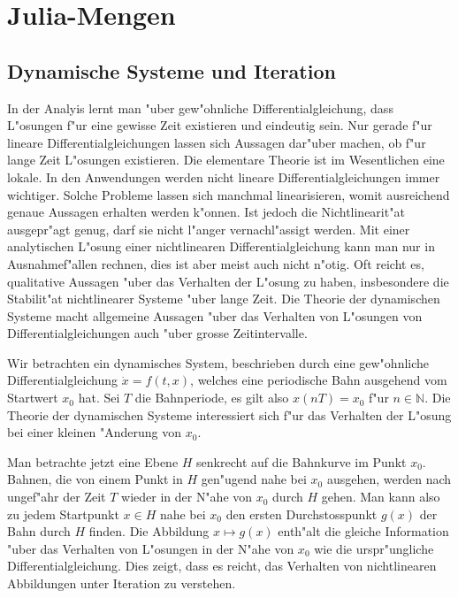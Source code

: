 \chapter{Julia-Mengen}
\begin{refsection}

\section{Dynamische Systeme und Iteration}
In der Analyis lernt man "uber 
gew"ohnliche Differentialgleichung, dass L"osungen f"ur eine gewisse
Zeit existieren und eindeutig sein.
Nur gerade f"ur lineare Differentialgleichungen lassen sich Aussagen 
dar"uber machen, ob f"ur lange Zeit L"osungen existieren.
Die elementare Theorie ist im Wesentlichen eine lokale.
In den Anwendungen werden nicht lineare Differentialgleichungen immer
wichtiger.
Solche Probleme lassen sich manchmal linearisieren, womit ausreichend
genaue Aussagen erhalten werden k"onnen.
Ist jedoch die Nichtlinearit"at ausgepr"agt genug, darf sie nicht l"anger
vernachl"assigt werden.
Mit einer analytischen L"osung einer nichtlinearen Differentialgleichung
kann man nur in Ausnahmef"allen rechnen, dies ist aber meist auch nicht
n"otig. Oft reicht es, qualitative Aussagen "uber das Verhalten der
L"osung zu haben,
insbesondere die Stabilit"at nichtlinearer Systeme "uber lange Zeit.
Die Theorie der dynamischen Systeme macht allgemeine Aussagen "uber das
Verhalten von L"osungen von Differentialgleichungen auch "uber grosse
Zeitintervalle.

Wir betrachten ein dynamisches System, beschrieben durch eine
gew"ohnliche Differentialgleichung $\dot x= f(t,x)$, welches eine
periodische Bahn ausgehend vom Startwert $x_0$ hat.
Sei $T$ die Bahnperiode, es gilt also
$x(nT)=x_0$ f"ur $n\in\mathbb N$.
Die Theorie der dynamischen Systeme interessiert sich f"ur das Verhalten
der L"osung bei einer kleinen "Anderung von $x_0$.

Man betrachte jetzt eine Ebene $H$ senkrecht auf die Bahnkurve im Punkt $x_0$.
Bahnen, die von einem Punkt in $H$ gen"ugend nahe bei $x_0$ ausgehen, werden
nach ungef"ahr der Zeit $T$ wieder in der N"ahe von $x_0$ durch $H$ gehen.
Man kann also zu jedem Startpunkt $x\in H$ nahe bei $x_0$ den ersten
Durchstosspunkt $g(x)$ der Bahn durch $H$ finden.
Die Abbildung $x\mapsto g(x)$ enth"alt die gleiche Information "uber das
Verhalten von L"osungen in der N"ahe von $x_0$ wie die urspr"ungliche
Differentialgleichung.
Dies zeigt, dass es reicht, das Verhalten von nichtlinearen Abbildungen
unter Iteration zu verstehen.


\end{refsection}
